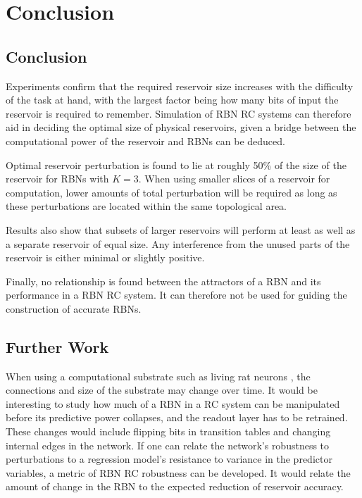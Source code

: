 \chapter{Conclusion}
\label{chapter:conclusion}

\section{Conclusion}

Experiments confirm that the required reservoir size increases with the difficulty of the task at hand,
with the largest factor being how many bits of input the reservoir is required to remember.
Simulation of RBN RC systems can therefore aid in deciding the optimal size of physical reservoirs,
given a bridge between the computational power of the reservoir and RBNs can be deduced.

Optimal reservoir perturbation is found to lie at roughly 50\% of the size of the reservoir for RBNs with $K=3$.
When using smaller slices of a reservoir for computation,
lower amounts of total perturbation will be required as long as these perturbations are located within the same topological area.

Results also show that subsets of larger reservoirs will perform at least as well as a separate reservoir of equal size.
Any interference from the unused parts of the reservoir is either minimal or slightly positive.

Finally, no relationship is found between the attractors of a RBN and its performance in a RBN RC system.
It can therefore not be used for guiding the construction of accurate RBNs.

\section{Further Work}

When using a computational substrate such as living rat neurons \cite{demarse2005adaptive},
the connections and size of the substrate may change over time.
It would be interesting to study how much of a RBN in a RC system can be manipulated before its predictive power collapses,
and the readout layer has to be retrained.
These changes would include flipping bits in transition tables and changing internal edges in the network.
If one can relate the network's robustness to perturbations to a regression model's resistance to variance in the predictor variables,
a metric of RBN RC robustness can be developed.
It would relate the amount of change in the RBN to the expected reduction of reservoir accuracy.

